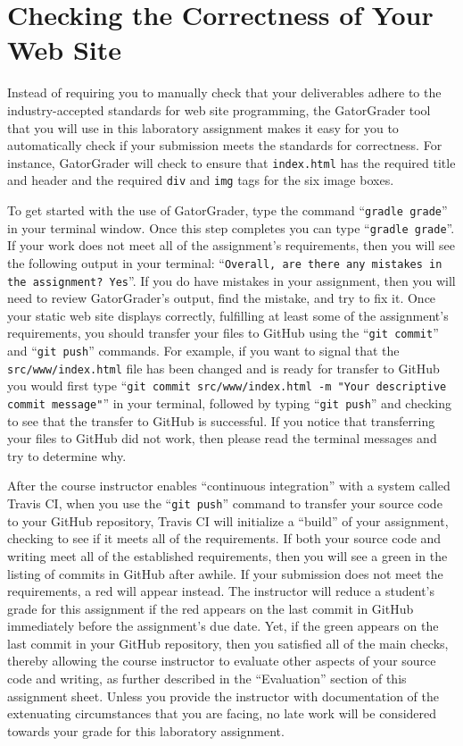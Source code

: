\documentclass[11pt]{article}
\newcommand{\mainprogram}{\lstinline{index.html}}
\newcommand{\mainprogramsource}{\lstinline{src/www/index.html}}
\newcommand{\gatorgraderstart}{\command{gradle grade}}
\newcommand{\gatorgradercheck}{\command{gradle grade}}
\newcommand{\gitcommit}{\command{git commit}}
\newcommand{\gitpush}{\command{git push}}
\newcommand{\gitcommitmainprogram}{\command{git commit src/www/index.html -m "Your
descriptive commit message"}}
\newcommand{\command}[1]{``\lstinline{#1}''}
\newcommand{\program}[1]{\lstinline{#1}}
\newcommand{\step}[1]{``{#1}''}
\newcommand{\checkmark}{\ding{51}}
\newcommand{\naughtmark}{\ding{55}}
\begin{document}
\section*{Checking the Correctness of Your Web Site}

Instead of requiring you to manually check that your deliverables adhere to the
industry-accepted standards for web site programming, the GatorGrader tool that
you will use in this laboratory assignment makes it easy for you to
automatically check if your submission meets the standards for correctness. For
instance, GatorGrader will check to ensure that \mainprogram{} has the required
title and header and the required \program{div} and \program{img} tags for the
six image boxes.

To get started with the use of GatorGrader, type the command \gatorgraderstart{}
in your terminal window. Once this step completes you can type
\gatorgradercheck{}. If your work does not meet all of the assignment's
requirements, then you will see the following output in your terminal:
\command{Overall, are there any mistakes in the assignment? Yes}. If you do have
mistakes in your assignment, then you will need to review GatorGrader's output,
find the mistake, and try to fix it. Once your static web site displays
correctly, fulfilling at least some of the assignment's requirements, you should
transfer your files to GitHub using the \gitcommit{} and \gitpush{} commands.
For example, if you want to signal that the \mainprogramsource{} file has been
changed and is ready for transfer to GitHub you would first type
\gitcommitmainprogram{} in your terminal, followed by typing \gitpush{} and
checking to see that the transfer to GitHub is successful. If you notice that
transferring your files to GitHub did not work, then please read the terminal
messages and try to determine why.

After the course instructor enables \step{continuous integration} with a system
called Travis CI, when you use the \gitpush{} command to transfer your source
code to your GitHub repository, Travis CI will initialize a \step{build} of your
assignment, checking to see if it meets all of the requirements. If both your
source code and writing meet all of the established requirements, then you will
see a green \checkmark{} in the listing of commits in GitHub after awhile. If
your submission does not meet the requirements, a red \naughtmark{} will appear
instead. The instructor will reduce a student's grade for this assignment if the
red \naughtmark{} appears on the last commit in GitHub immediately before the
assignment's due date. Yet, if the green \checkmark{} appears on the last commit
in your GitHub repository, then you satisfied all of the main checks, thereby
allowing the course instructor to evaluate other aspects of your source code and
writing, as further described in the \step{Evaluation} section of this
assignment sheet. Unless you provide the instructor with documentation of the
extenuating circumstances that you are facing, no late work will be considered
towards your grade for this laboratory assignment.
\end{document}

